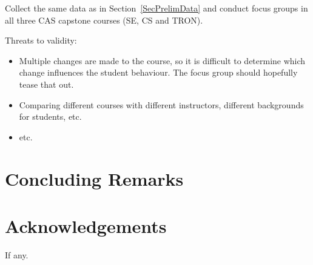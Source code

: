 \documentclass[10pt, conference]{IEEEtran}
\begin{document}
Collect the same data as in Section~\ref{SecPrelimData} and conduct focus groups
in all three CAS capstone courses (SE, CS and TRON).  

Threats to validity:

\begin{itemize}
    \item Multiple changes are made to the course, so it is difficult to
    determine which change influences the student behaviour.  The focus group
    should hopefully tease that out.
    \item Comparing different courses with different instructors, different
    backgrounds for students, etc.
    \item etc.
\end{itemize}

\section{Concluding Remarks} \label{SecConclusions}

\section*{Acknowledgements}

If any.



\end{document}
